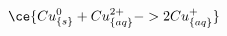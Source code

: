 \documentclass[../main.tex]{subfiles}%
\begin{document}
%
    \Xequation%
    \begin{equation}%
        \ce{Cu^{0}_{\{s\}} + Cu^{2+}_{\{aq\}} -> 2Cu^{+}_{\{aq\}}}%
        \label{eq:copper-etch-1}%
    \end{equation}%
\end{document}
